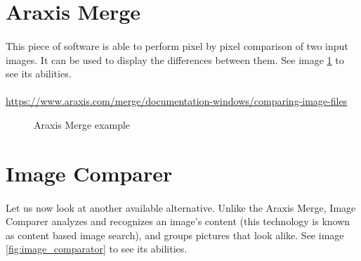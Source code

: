 \section{Araxis Merge}
\paragraph{}
This piece of software is able to perform pixel by pixel comparison of two input images. It can be used to display the differences between them. See image \ref{fig:araxis_input_output} to see its abilities.

\paragraph{}
\footnotesize{\url{https://www.araxis.com/merge/documentation-windows/comparing-image-files}}

\begin{figure}[H]
     \centering
     \qquad
     \caption{Araxis Merge example}
     \label{fig:araxis_input_output}
\end{figure}

\section{Image Comparer}
\paragraph{}
Let us now look at another available alternative. Unlike the Araxis Merge, Image Comparer analyzes and recognizes an image's content (this technology is known as content based image search), and groups pictures that look alike. See image \ref{fig:image_comparator} to see its abilities.

